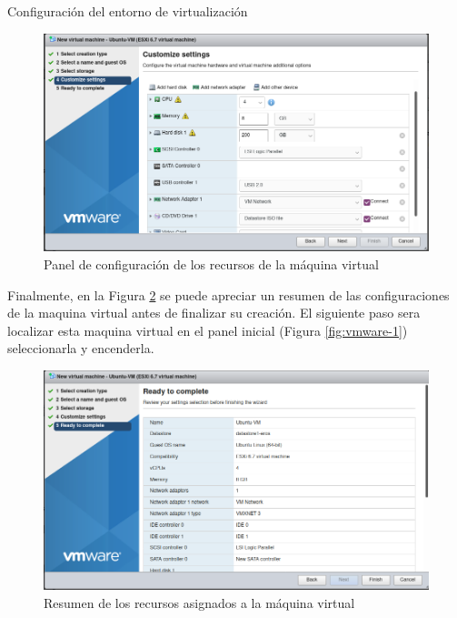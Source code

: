 \begin{section}{Configuración del entorno de virtualización}
         \begin{figure}[H]
          \centering
           \includegraphics[width=1\textwidth]{./Anexos-imagenes/vmware-5.png}
            \caption{Panel de configuración de los recursos de la máquina virtual}
            \label{fig:vmware-5}
        \end{figure}
        \FloatBarrier
        Finalmente, en la Figura \ref{fig:vmware-6} se puede apreciar un resumen de las configuraciones de la maquina virtual antes de finalizar su creación. El siguiente paso sera localizar esta maquina virtual en el panel inicial (Figura \ref{fig:vmware-1}) seleccionarla y encenderla.
         \begin{figure}[H]
          \centering
           \includegraphics[width=1\textwidth]{./Anexos-imagenes/vmware-6.png}
            \caption{Resumen de los recursos asignados a la máquina virtual}
            \label{fig:vmware-6}
        \end{figure}
        \end{section}
        
